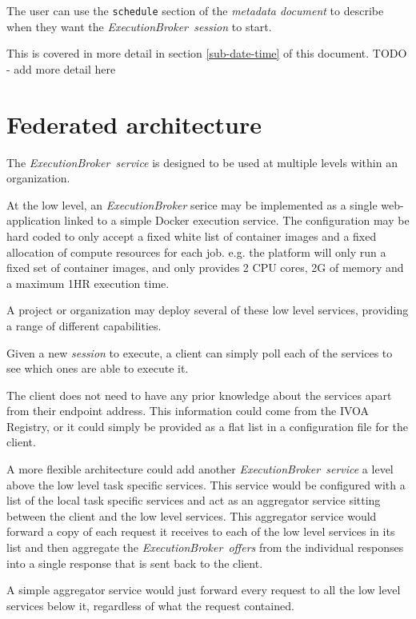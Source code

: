\documentclass[11pt,a4paper]{ivoa}
\newcommand{\ivoa} {IVOA}
\newcommand{\execbrokerclass} {\textit{ExecutionBroker}}
\newcommand{\execbrokerservice}[1] {\textit{ExecutionBroker~service#1}}
\newcommand{\execoffer}[1] {\textit{ExecutionBroker~offer#1}}
\newcommand{\execsession}[1] {\textit{ExecutionBroker~session#1}}
\newcommand{\metadoc} [1]{\textit{metadata document#1}}
\newcommand{\workerjob}[1] {\textit{session#1}}
\newcommand{\docker} {Docker}
\newcommand{\codeword}[1] {\texttt{#1}}
\newcommand{\cpu}[1] {CPU#1}
\begin{document}
The user can use the \codeword{schedule} section of the \metadoc{}
to describe when they want the \execsession{} to start.

This is covered in more detail in section \ref{sub-date-time} of this document.
TODO - add more detail here

\pagebreak

\section{Federated architecture}
\label{sect-sect-federation}

The \execbrokerservice{} is designed to be used at multiple levels within an organization.

At the low level, an \execbrokerclass{} serice may be implemented as a
single web-application linked to a simple \docker{} execution service.
The configuration may be hard coded to only accept a fixed white list of container images
and a fixed allocation of compute resources for each job{}.
e.g. the platform will only run a fixed set of container images, and only provides 2 \cpu{} cores, 2G of memory and a maximum 1HR execution time.

A project or organization may deploy several of these low level services,
providing a range of different capabilities.

Given a new \workerjob{} to execute, a client can simply poll each of the services to see which ones are
able to execute it.

The client does not need to have any prior knowledge about the services apart from their
endpoint address.
This information could come from the \ivoa{} Registry, or it could simply
be provided as a flat list in a configuration file for the client.

A more flexible architecture could add another \execbrokerservice{}
a level above the low level task specific services.
This service would be configured with a list of the local task specific services
and act as an aggregator service sitting between the client and the low level services.
This aggregator service would forward a copy of each request it receives to each of the low level services in its list and
then aggregate the \execoffer{s} from the individual responses into a single response that is sent back to the client.

A simple aggregator service would just forward every request to all the low level services below it,
regardless of what the request contained.
\end{document}

